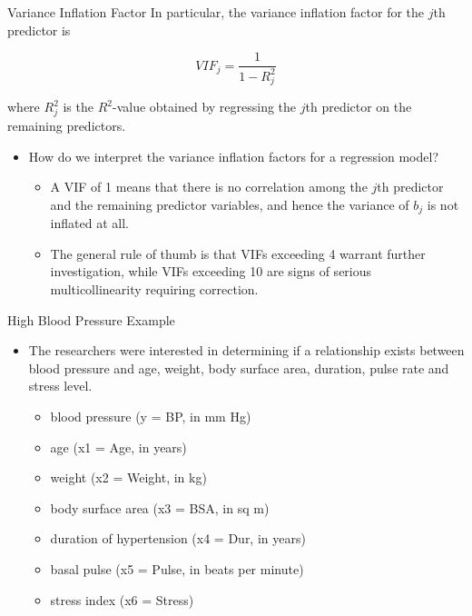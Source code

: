 \documentclass[
  ignorenonframetext,
]{beamer}
\providecommand{\tightlist}{%
  \setlength{\itemsep}{0pt}\setlength{\parskip}{0pt}}
\begin{document}
\begin{frame}{Variance Inflation Factor}
\protect\hypertarget{variance-inflation-factor-1}{}
In particular, the variance inflation factor for the \(j\)th predictor
is

\[VIF_j=\frac{1}{1-R^2_j}\]

where \(R^2_j\) is the \(R^2\)-value obtained by regressing the \(j\)th
predictor on the remaining predictors.

\begin{itemize}
\item
  How do we interpret the variance inflation factors for a regression
  model?

  \begin{itemize}
  \tightlist
  \item
    A VIF of 1 means that there is no correlation among the \(j\)th
    predictor and the remaining predictor variables, and hence the
    variance of \(b_j\) is not inflated at all.
  \item
    The general rule of thumb is that VIFs exceeding 4 warrant further
    investigation, while VIFs exceeding 10 are signs of serious
    multicollinearity requiring correction.
  \end{itemize}
\end{itemize}
\end{frame}

\begin{frame}{High Blood Pressure Example}
\protect\hypertarget{high-blood-pressure-example}{}
\begin{itemize}
\item
  The researchers were interested in determining if a relationship
  exists between blood pressure and age, weight, body surface area,
  duration, pulse rate and stress level.

  \begin{itemize}
  \tightlist
  \item
    blood pressure (y = BP, in mm Hg)
  \item
    age (x1 = Age, in years)
  \item
    weight (x2 = Weight, in kg)
  \item
    body surface area (x3 = BSA, in sq m)
  \item
    duration of hypertension (x4 = Dur, in years)
  \item
    basal pulse (x5 = Pulse, in beats per minute)
  \item
    stress index (x6 = Stress)
  \end{itemize}
\end{itemize}
\end{frame}
\end{document}
